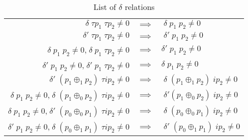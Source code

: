 \documentclass{llncs}
\begin{document}
\begin{table}
\begin{center}
\begin{tabular}{ r c l }
  $\delta \; \tau p_1 \; \tau p_2 \neq 0$
  & $\implies$ & $\; \delta \; p_1 \; p_2 \neq 0$ \\ 
  $\delta' \; \tau p_1 \; \tau p_2 \neq 0$
  & $\implies$ & $\; \delta' \; p_1 \; p_2 \neq 0$ \\ 
  $\delta \; p_1 \; p_2 \neq 0$,$\; \delta \; p_1 \; \tau p_2 \neq 0$
  & $\implies$ & $\delta' \; p_1 \; p_2 \neq 0$ \\ 
  $\delta' \; p_1 \; p_2 \neq 0$,$\; \delta' \; p_1 \; \tau p_2 \neq 0$
  & $\implies$ & $\delta \; p_1 \;p_2 \neq 0$ \\
%  
  \hline
%
  $\delta' \; (p_1 \oplus_1 p_2) \; \tau i p_2 \neq 0$
  & $\implies$ & $\; \delta \; (p_1 \oplus_1 p_2) \; i p_2 \neq 0$ \\ 
  $\delta \; p_1 \; p_2 \neq 0$,$\; \delta \; (p_1 \oplus_0 p_2) \; \tau i p_2 \neq 0$
  & $\implies$ & $\; \delta' (p_1 \oplus_0 p_2) \; i p_2 \neq 0$ \\ 
  $\delta \; p_1 \; p_2 \neq 0$,$\; \delta' \; (p_0 \oplus_0 p_1) \; \tau i p_2 \neq 0$
  & $\implies$ & $\; \delta \; (p_0 \oplus_0 p_1) \; i p_2 \neq 0$ \\ 	    
  $\delta' \; p_1 \; p_2 \neq 0$,$\; \delta \; (p_0 \oplus_1 p_1) \; \tau i p_2 \neq 0$
  & $\implies$ & $\; \delta' \; (p_0 \oplus_1 p_1) \; i p_2 \neq 0$ \\
\end{tabular}
\end{center}
	\caption{List of $\delta$ relations}
	\label{table:1}
\end{table}
%
\end{document}
